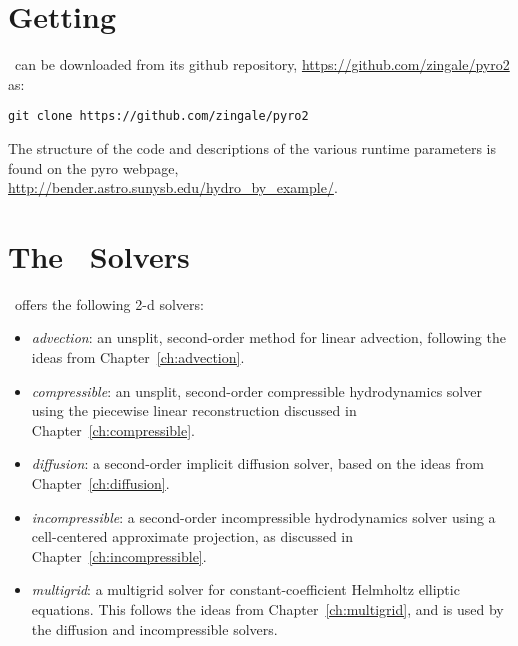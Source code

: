\label{app:pyro}

\begin{quote}
\end{quote}


\section{Getting \pyro}

\pyro\ can be downloaded from its github repository, \url{https://github.com/zingale/pyro2} as:
\begin{verbatim}
git clone https://github.com/zingale/pyro2
\end{verbatim}

The structure of the code and descriptions of the various runtime
parameters is found on the pyro webpage,
\url{http://bender.astro.sunysb.edu/hydro_by_example/}.

\section{The \pyro\ Solvers}

\pyro\ offers the following 2-d solvers:
\begin{itemize}
\item {\em advection}: an unsplit, second-order method for linear advection,
  following the ideas from Chapter~\ref{ch:advection}.

\item {\em compressible}: an unsplit, second-order compressible hydrodynamics
  solver using the piecewise linear reconstruction discussed in Chapter~\ref{ch:compressible}.

\item {\em diffusion}: a second-order implicit diffusion solver, based
  on the ideas from Chapter~\ref{ch:diffusion}.

\item {\em incompressible}: a second-order incompressible hydrodynamics
  solver using a cell-centered approximate projection, as discussed
  in Chapter~\ref{ch:incompressible}.

\item {\em multigrid}: a multigrid solver for constant-coefficient Helmholtz
  elliptic equations.  This follows the ideas from Chapter~\ref{ch:multigrid},
  and is used by the diffusion and incompressible solvers.

\end{itemize}

